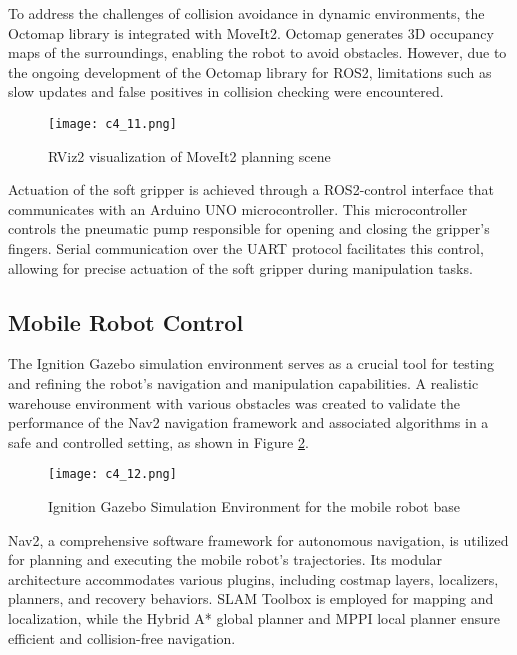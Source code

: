 To address the challenges of collision avoidance in dynamic environments, the Octomap library is integrated with
MoveIt2. Octomap generates 3D occupancy maps of the surroundings, enabling the robot to avoid obstacles. 
However, due to the ongoing development of the Octomap library for ROS2, limitations such as slow updates and 
false positives in collision checking were encountered.

\begin{figure}[t]
    \centering
    \texttt{[image: c4\_11.png]}
    \caption{RViz2 visualization of MoveIt2 planning scene}
    \label{fig:moveit2}
\end{figure}

Actuation of the soft gripper is achieved through a ROS2-control interface that communicates with an Arduino UNO
microcontroller. This microcontroller controls the pneumatic pump responsible for opening and closing the gripper's fingers.
Serial communication over the UART protocol facilitates this control, allowing for precise actuation of the soft
gripper during manipulation tasks.

\subsection{Mobile Robot Control}

The Ignition Gazebo simulation environment serves as a crucial tool for testing and refining the robot's navigation
and manipulation capabilities. A realistic warehouse environment with various obstacles was created to validate 
the performance of the Nav2 navigation framework and associated algorithms in a safe and controlled setting,
as shown in Figure \ref{fig:ignition}.

\begin{figure}[t]
    \centering
    \texttt{[image: c4\_12.png]}
    \caption{Ignition Gazebo Simulation Environment for the mobile robot base}
    \label{fig:ignition}
\end{figure}

Nav2, a comprehensive software framework for autonomous navigation, is utilized for planning and executing the mobile
robot's trajectories. Its modular architecture accommodates various plugins, including costmap layers, localizers,
planners, and recovery behaviors. SLAM Toolbox is employed for mapping and localization, while the Hybrid A* 
global planner and MPPI local planner ensure efficient and collision-free navigation.

